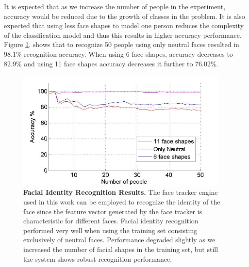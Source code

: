 \documentclass[]{article}
\begin{document}
It is expected that as we increase the number of people in the experiment, accuracy would be reduced due to the growth
of classes in the problem. It is also expected  that using less face shapes to model one person reduces the complexity
of the classification model and thus this results in higher accuracy performance. Figure \ref{identityRecognition},
shows that to recognize 50 people using only neutral faces resulted in 98.1\% recognition accuracy.  When using 6 face
shapes, accuracy decreases to 82.9\% and using 11 face shapes accuracy decreases it further to 76.02\%.


\begin{figure}[ht]
\begin{center}
\vspace{-3mm}
\includegraphics[width=0.95\textwidth]{figures/peopleRecognition4.jpg}
\end{center}
\caption{\textbf{Facial Identity Recognition Results.} The face tracker engine used in this work can be employed 
to recognize the identity of the face since the feature vector generated by the face tracker is characteristic for
different faces. Facial identity recognition performed very well when using the training set consisting exclusively
of neutral faces. Performance degraded slightly as we increased the number of facial shapes in the training set, 
but still the system shows robust  recognition performance.}
\label{identityRecognition}
\end{figure}
\end{document}
